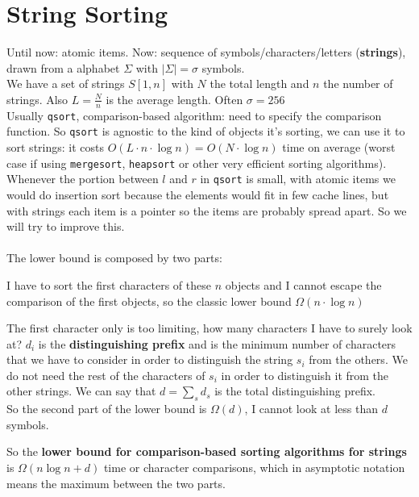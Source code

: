 \documentclass[10pt]{report}
\begin{document}
\section{String Sorting} Until now: atomic items. Now: sequence of symbols/characters/letters (\textbf{strings}), drawn from a alphabet $\Sigma$ with $|\Sigma| = \sigma$ symbols.\\
We have a set of strings $S[1,n]$ with $N$ the total length and $n$ the number of strings. Also $L=\frac{N}{n}$ is the average length. Often $\sigma = 256$\\
Usually \texttt{qsort}, comparison-based algorithm: need to specify the comparison function. So \texttt{qsort} is agnostic to the kind of objects it's sorting, we can use it to sort strings: it costs $O(L\cdot n\cdot\log n) = O(N\cdot\log n)$ time on average (worst case if using \texttt{mergesort}, \texttt{heapsort} or other very efficient sorting algorithms). Whenever the portion between $l$ and $r$ in \texttt{qsort} is small, with atomic items we would do insertion sort because the elements would fit in few cache lines, but with strings each item is a pointer so the items are probably spread apart. So we will try to improve this.\\\\
The lower bound is composed by two parts: \begin{list}{}{}
	\item I have to sort the first characters of these $n$ objects and I cannot escape the comparison of the first objects, so the classic lower bound $\Omega(n\cdot\log n)$
	\item The first character only is too limiting, how many characters I have to surely look at? $d_i$ is the \textbf{distinguishing prefix} and is the minimum number of characters that we have to consider in order to distinguish the string $s_i$ from the others. We do not need the rest of the characters of $s_i$ in order to distinguish it from the other strings. We can say that $d = \sum_s d_s$ is the total distinguishing prefix.\\
	So the second part of the lower bound is $\Omega(d)$, I cannot look at less than $d$ symbols.
\end{list}
So the \textbf{lower bound for comparison-based sorting algorithms for strings} is $\Omega(n\log n + d)$ time or character comparisons, which in asymptotic notation means the maximum between the two parts.
\end{document}
